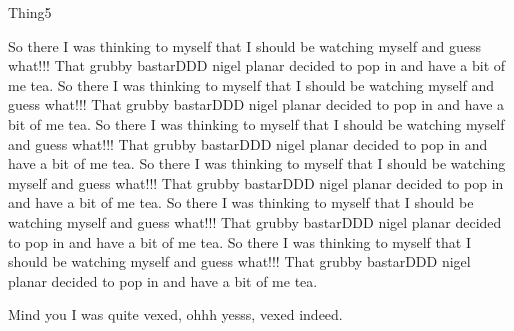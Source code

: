 \begin{define}{Thing5}

So there I was thinking to myself that I should be 
watching myself and guess what!!!
That grubby bastarDDD nigel planar decided to pop in and have a bit of
me tea. 
So there I was thinking to myself that I should be 
watching myself and guess what!!!
That grubby bastarDDD nigel planar decided to pop in and have a bit of
me tea. So there I was thinking to myself that I should be 
watching myself and guess what!!!
That grubby bastarDDD nigel planar decided to pop in and have a bit of
me tea. So there I was thinking to myself that I should be 
watching myself and guess what!!!
That grubby bastarDDD nigel planar decided to pop in and have a bit of
me tea. 
So there I was thinking to myself that I should be 
watching myself and guess what!!!
That grubby bastarDDD nigel planar decided to pop in and have a bit of
me tea. So there I was thinking to myself that I should be 
watching myself and guess what!!!
That grubby bastarDDD nigel planar decided to pop in and have a bit of
me tea. 

Mind you I was quite vexed, ohhh yesss, vexed indeed.   

\end{define}